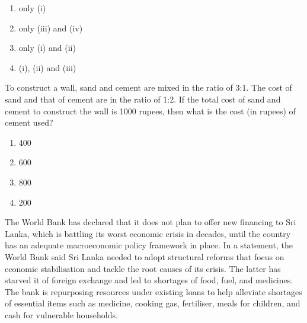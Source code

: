   \begin{enumerate}
    \item only (i)
    \item only (iii) and (iv)
    \item only (i) and (ii)
    \item (i), (ii) and (iii)
  \end{enumerate}

\item To construct a wall, sand and cement are mixed in the ratio of 3:1. The cost of sand and that of cement are in the ratio of 1:2. If the total cost of sand and cement to construct the wall is 1000 rupees, then what is the cost (in rupees) of cement used?
  \begin{enumerate}
    \item 400
    \item 600
    \item 800
    \item 200
  \end{enumerate}
\item The World Bank has declared that it does not plan to offer new financing to Sri
Lanka, which is battling its worst economic crisis in decades, until the country has
an adequate macroeconomic policy framework in place. In a statement, the World
Bank said Sri Lanka needed to adopt structural reforms that focus on economic
stabilisation and tackle the root causes of its crisis. The latter has starved it of
foreign exchange and led to shortages of food, fuel, and medicines. The bank is
repurposing resources under existing loans to help alleviate shortages of essential
items such as medicine, cooking gas, fertiliser, meals for children, and cash for
vulnerable households.\\

